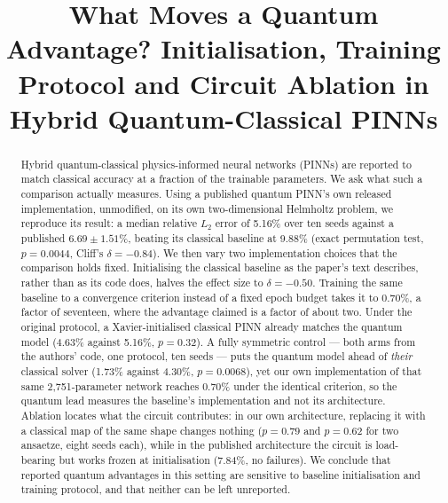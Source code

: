 \documentclass[conference,a4paper]{IEEEtran}
\begin{document}
\title{What Moves a Quantum Advantage? Initialisation, Training Protocol and
Circuit Ablation in Hybrid Quantum-Classical PINNs}

\author{
\and
{}
}

\maketitle

\begin{abstract}
Hybrid quantum-classical physics-informed neural networks (PINNs) are reported to match
classical accuracy at a fraction of the trainable parameters. We ask what such a
comparison actually measures. Using a published quantum PINN's own released
implementation, unmodified, on its own two-dimensional Helmholtz problem, we reproduce
its result: a median relative $L_2$ error of 5.16\% over ten seeds against a published
$6.69 \pm 1.51\%$, beating its classical baseline at 9.88\% (exact permutation test,
$p = 0.0044$, Cliff's $\delta = -0.84$). We then vary two implementation choices that the
comparison holds fixed. Initialising the classical baseline as the paper's text describes,
rather than as its code does, halves the effect size to $\delta = -0.50$. Training the
same baseline to a convergence criterion instead of a fixed epoch budget takes it to
0.70\%, a factor of seventeen, where the advantage claimed is a factor of about two.
Under the original protocol, a Xavier-initialised classical PINN already matches the
quantum model (4.63\% against 5.16\%, $p = 0.32$). A fully symmetric control --- both arms
from the authors' code, one protocol, ten seeds --- puts the quantum model ahead of
\emph{their} classical solver (1.73\% against 4.30\%, $p = 0.0068$), yet our own
implementation of that same 2{,}751-parameter network reaches 0.70\% under the identical
criterion, so the quantum lead measures the baseline's implementation and not its
architecture. Ablation locates what the circuit
contributes: in our own architecture, replacing it with a classical map of the same shape
changes nothing ($p = 0.79$ and $p = 0.62$ for two ansaetze, eight seeds each), while in
the published architecture the circuit is load-bearing but works frozen at initialisation
(7.84\%, no failures). We conclude that reported quantum advantages in this setting are
sensitive to baseline initialisation and training protocol, and that neither can be left
unreported.
\end{abstract}
\end{document}
